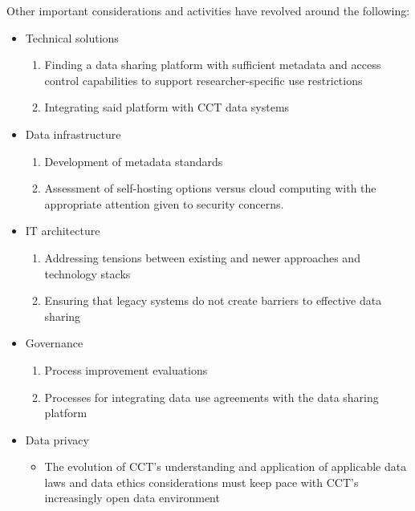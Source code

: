 \documentclass[
]{book}
\providecommand{\tightlist}{%
  \setlength{\itemsep}{0pt}\setlength{\parskip}{0pt}}
\begin{document}
Other important considerations and activities have revolved around the following:

\begin{itemize}
\tightlist
\item
  Technical solutions

  \begin{enumerate}
  \def\labelenumi{\alph{enumi}.}
  \tightlist
  \item
    Finding a data sharing platform with sufficient metadata and access control capabilities to support researcher-specific use restrictions
  \item
    Integrating said platform with CCT data systems
  \end{enumerate}
\item
  Data infrastructure

  \begin{enumerate}
  \def\labelenumi{\alph{enumi}.}
  \tightlist
  \item
    Development of metadata standards
  \item
    Assessment of self-hosting options versus cloud computing with the appropriate attention given to security concerns.
  \end{enumerate}
\item
  IT architecture

  \begin{enumerate}
  \def\labelenumi{\alph{enumi}.}
  \tightlist
  \item
    Addressing tensions between existing and newer approaches and technology stacks
  \item
    Ensuring that legacy systems do not create barriers to effective data sharing
  \end{enumerate}
\item
  Governance

  \begin{enumerate}
  \def\labelenumi{\alph{enumi}.}
  \tightlist
  \item
    Process improvement evaluations
  \item
    Processes for integrating data use agreements with the data sharing platform
  \end{enumerate}
\item
  Data privacy

  \begin{itemize}
  \tightlist
  \item
    The evolution of CCT's understanding and application of applicable data laws and data ethics considerations must keep pace with CCT's increasingly open data environment
  \end{itemize}
\end{itemize}
\end{document}
